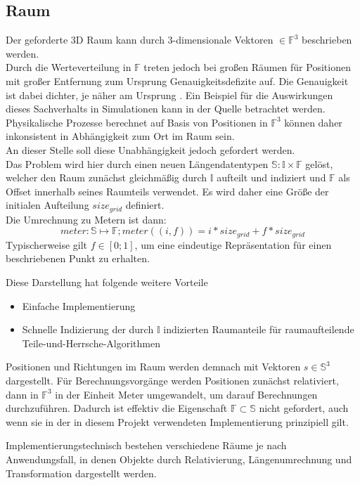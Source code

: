 \subsection{Raum}
\label{sec:space}
Der geforderte 3D Raum kann durch 3-dimensionale Vektoren $\in \mathbb{F}^3$ beschrieben werden.\\
Durch die Werteverteilung in $\mathbb{F}$ treten jedoch bei großen Räumen für Positionen mit großer Entfernung zum Ursprung Genauigkeitsdefizite auf. Die Genauigkeit ist dabei dichter, je näher am Ursprung \cite{floatdistribution}. Ein Beispiel für die Auswirkungen dieses Sachverhalts in Simulationen kann in der Quelle \cite{floatdistributionexample} betrachtet werden.\\
Physikalische Prozesse berechnet auf Basis von Positionen in $\mathbb{F}^3$ können daher inkonsistent in Abhängigkeit zum Ort im Raum sein.\\
An dieser Stelle soll diese Unabhängigkeit jedoch gefordert werden.\\
Das Problem wird hier durch einen neuen Längendatentypen $\mathbb{S} : \mathbb{I} \times \mathbb{F}$ gelöst, welcher den Raum zunächst gleichmäßig durch $\mathbb{I}$ aufteilt und indiziert und $\mathbb{F}$ als Offset innerhalb seines Raumteils verwendet. Es wird daher eine Größe der initialen Aufteilung $size_{grid}$ definiert.\\
Die Umrechnung zu Metern ist dann: $$ meter: \mathbb{S} \mapsto \mathbb{F};  meter((i, f)) = i * size_{grid} + f * size_{grid}$$ 
Typischerweise gilt $f \in [0;1]$, um eine eindeutige Repräsentation für einen beschriebenen Punkt zu erhalten.

Diese Darstellung hat folgende weitere Vorteile
\begin{itemize}
\item Einfache Implementierung
\item Schnelle Indizierung der durch $\mathbb{I}$ indizierten Raumanteile für raumaufteilende Teile-und-Herrsche-Algorithmen
\end{itemize}

Positionen und Richtungen im Raum werden demnach mit Vektoren $s\in\mathbb{S}^3$ dargestellt. Für Berechnungsvorgänge werden Positionen zunächst relativiert, dann in $\mathbb{F}^3$ in der Einheit Meter umgewandelt, um darauf Berechnungen durchzuführen. Dadurch ist effektiv die Eigenschaft $\mathbb{F}\subset\mathbb{S}$ nicht gefordert, auch wenn sie in der in diesem Projekt verwendeten Implementierung prinzipiell gilt.

Implementierungstechnisch bestehen verschiedene Räume je nach Anwendungsfall, in denen Objekte durch Relativierung, Längenumrechnung und Transformation dargestellt werden.

